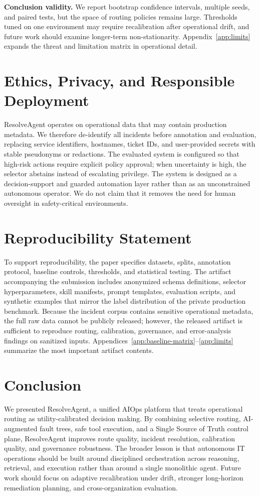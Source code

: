\documentclass[conference]{IEEEtran}
\begin{document}
\textbf{Conclusion validity.} We report bootstrap confidence intervals, multiple seeds, and paired tests, but the space of routing policies remains large. Thresholds tuned on one environment may require recalibration after operational drift, and future work should examine longer-term non-stationarity. Appendix~\ref{app:limits} expands the threat and limitation matrix in operational detail.

\section{Ethics, Privacy, and Responsible Deployment}
ResolveAgent operates on operational data that may contain production metadata. We therefore de-identify all incidents before annotation and evaluation, replacing service identifiers, hostnames, ticket IDs, and user-provided secrets with stable pseudonyms or redactions. The evaluated system is configured so that high-risk actions require explicit policy approval; when uncertainty is high, the selector abstains instead of escalating privilege. The system is designed as a decision-support and guarded automation layer rather than as an unconstrained autonomous operator. We do not claim that it removes the need for human oversight in safety-critical environments.

\section{Reproducibility Statement}
To support reproducibility, the paper specifies datasets, splits, annotation protocol, baseline controls, thresholds, and statistical testing. The artifact accompanying the submission includes anonymized schema definitions, selector hyperparameters, skill manifests, prompt templates, evaluation scripts, and synthetic examples that mirror the label distribution of the private production benchmark. Because the incident corpus contains sensitive operational metadata, the full raw data cannot be publicly released; however, the released artifact is sufficient to reproduce routing, calibration, governance, and error-analysis findings on sanitized inputs. Appendices~\ref{app:baseline-matrix}--\ref{app:limits} summarize the most important artifact contents.

\section{Conclusion}
We presented ResolveAgent, a unified AIOps platform that treats operational routing as utility-calibrated decision making. By combining selective routing, AI-augmented fault trees, safe tool execution, and a Single Source of Truth control plane, ResolveAgent improves route quality, incident resolution, calibration quality, and governance robustness. The broader lesson is that autonomous IT operations should be built around disciplined orchestration across reasoning, retrieval, and execution rather than around a single monolithic agent. Future work should focus on adaptive recalibration under drift, stronger long-horizon remediation planning, and cross-organization evaluation.
\end{document}

